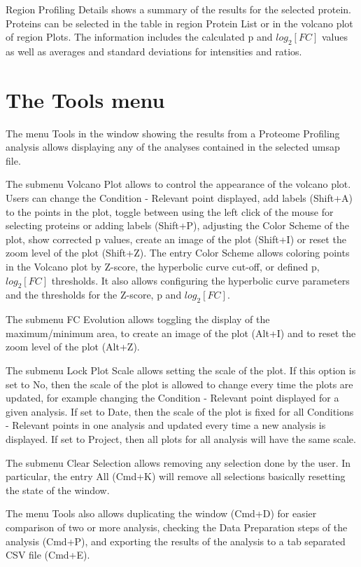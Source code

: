 Region Profiling Details shows a summary of the results for the selected protein.
Proteins can be selected in the table in region Protein List or in the volcano plot
of region Plots. The information includes the calculated p and $log_2[FC]$ values
as well as averages and standard deviations for intensities and ratios.

\section{The Tools menu}
\label{sec:protprofTools}

The menu Tools in the window showing the results from a Proteome Profiling analysis
allows displaying any of the analyses contained in the selected umsap file.

The submenu Volcano Plot allows to control the appearance of the volcano plot. Users
can change the Condition - Relevant point displayed, add labels (Shift+A) to
the points in the plot, toggle between using the left click of the mouse for selecting
proteins or adding labels (Shift+P), adjusting the Color Scheme of the plot, show
corrected p values, create an image of the plot (Shift+I) or reset the zoom level of
the plot (Shift+Z). The entry Color Scheme allows coloring points in the Volcano plot
by Z-score, the hyperbolic curve cut-off, or defined p, $log_2[FC]$ thresholds. It
also allows configuring the hyperbolic curve parameters and the thresholds for the
Z-score, p and $log_2[FC]$.

The submenu FC Evolution allows toggling the display of the maximum/minimum area,
to create an image of the plot (Alt+I) and to reset the zoom level of the plot (Alt+Z).

The submenu Lock Plot Scale allows setting the scale of the plot. If this option
is set to No, then the scale of the plot is allowed to change every time the plots
are updated, for example changing the Condition - Relevant point displayed for a
given analysis. If set to Date, then the scale of the plot is fixed for all Conditions
- Relevant points in one analysis and updated every time a new analysis is displayed.
If set to Project, then all plots for all analysis will have the same scale.

The submenu Clear Selection allows removing any selection done by the user. In
particular, the entry All (Cmd+K) will remove all selections basically resetting
the state of the window.

The menu Tools also allows duplicating the window (Cmd+D) for easier comparison of
two or more analysis, checking the Data Preparation steps of the analysis (Cmd+P),
and exporting the results of the analysis to a tab separated CSV file (Cmd+E).

